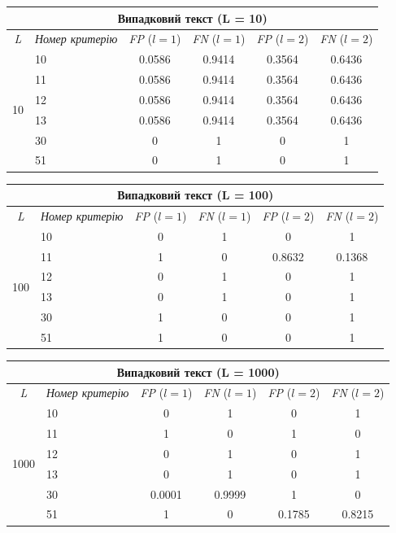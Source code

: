 \documentclass[a4paper,12pt]{article}
\begin{document}
\begin{center}
\renewcommand{\arraystretch}{1.2}
\setlength{\tabcolsep}{6pt}
\begin{tabular}{|c|l||c|c||c|c|}
\hline
\multicolumn{6}{|c|}{Випадковий текст (L = 10)} \\
\hline
\textit{L} & \textit{Номер критерію} & \textit{FP} ($l=1$) & \textit{FN} ($l=1$) & \textit{FP} ($l=2$) & \textit{FN} ($l=2$) \\
\hline
\multirow{6}{*}{10} & 10 & 0.0586 & 0.9414 & 0.3564 & 0.6436 \\
 & 11 & 0.0586 & 0.9414 & 0.3564 & 0.6436 \\
 & 12 & 0.0586 & 0.9414 & 0.3564 & 0.6436 \\
 & 13 & 0.0586 & 0.9414 & 0.3564 & 0.6436 \\
 & 30 & 0 & 1 & 0 & 1 \\
 & 51 & 0 & 1 & 0 & 1 \\
\hline
\end{tabular}
\end{center}

\begin{center}
\renewcommand{\arraystretch}{1.2}
\setlength{\tabcolsep}{6pt}
\begin{tabular}{|c|l||c|c||c|c|}
\hline
\multicolumn{6}{|c|}{Випадковий текст (L = 100)} \\
\hline
\textit{L} & \textit{Номер критерію} & \textit{FP} ($l=1$) & \textit{FN} ($l=1$) & \textit{FP} ($l=2$) & \textit{FN} ($l=2$) \\
\hline
\multirow{6}{*}{100} & 10 & 0 & 1 & 0 & 1 \\
 & 11 & 1 & 0 & 0.8632 & 0.1368 \\
 & 12 & 0 & 1 & 0 & 1 \\
 & 13 & 0 & 1 & 0 & 1 \\
 & 30 & 1 & 0 & 0 & 1 \\
 & 51 & 1 & 0 & 0 & 1 \\
\hline
\end{tabular}
\end{center}

\begin{center}
\renewcommand{\arraystretch}{1.2}
\setlength{\tabcolsep}{6pt}
\begin{tabular}{|c|l||c|c||c|c|}
\hline
\multicolumn{6}{|c|}{Випадковий текст (L = 1000)} \\
\hline
\textit{L} & \textit{Номер критерію} & \textit{FP} ($l=1$) & \textit{FN} ($l=1$) & \textit{FP} ($l=2$) & \textit{FN} ($l=2$) \\
\hline
\multirow{6}{*}{1000} & 10 & 0 & 1 & 0 & 1 \\
 & 11 & 1 & 0 & 1 & 0 \\
 & 12 & 0 & 1 & 0 & 1 \\
 & 13 & 0 & 1 & 0 & 1 \\
 & 30 & 0.0001 & 0.9999 & 1 & 0 \\
 & 51 & 1 & 0 & 0.1785 & 0.8215 \\
\hline
\end{tabular}
\end{center}
\end{document}
